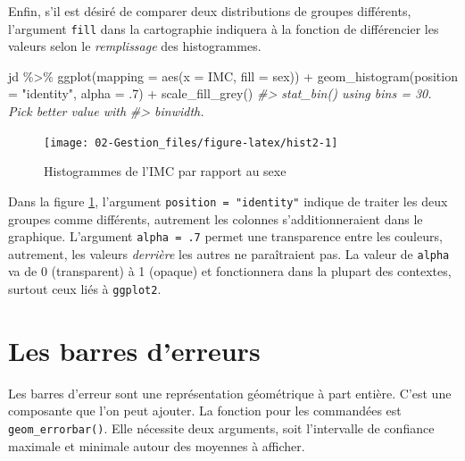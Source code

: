 \documentclass[
]{book}
\newenvironment{Shaded}{}{}
\newcommand{\AttributeTok}[1]{#1}
\newcommand{\CommentTok}[1]{\textit{#1}}
\newcommand{\DecValTok}[1]{#1}
\newcommand{\FunctionTok}[1]{#1}
\newcommand{\NormalTok}[1]{#1}
\newcommand{\SpecialCharTok}[1]{#1}
\newcommand{\StringTok}[1]{#1}
\begin{document}
Enfin, s'il est désiré de comparer deux distributions de groupes différents, l'argument \texttt{fill} dans la cartographie indiquera à la fonction de différencier les valeurs selon le \emph{remplissage} des histogrammes.

\begin{Shaded}
\begin{Highlighting}[]
\NormalTok{jd }\SpecialCharTok{\%\textgreater{}\%} 
  \FunctionTok{ggplot}\NormalTok{(}\AttributeTok{mapping =} \FunctionTok{aes}\NormalTok{(}\AttributeTok{x =}\NormalTok{ IMC, }\AttributeTok{fill =}\NormalTok{ sex)) }\SpecialCharTok{+} 
  \FunctionTok{geom\_histogram}\NormalTok{(}\AttributeTok{position =} \StringTok{"identity"}\NormalTok{, }\AttributeTok{alpha =}\NormalTok{ .}\DecValTok{7}\NormalTok{) }\SpecialCharTok{+} 
  \FunctionTok{scale\_fill\_grey}\NormalTok{()}
\CommentTok{\#\textgreater{} \textasciigrave{}stat\_bin()\textasciigrave{} using \textasciigrave{}bins = 30\textasciigrave{}. Pick better value with}
\CommentTok{\#\textgreater{} \textasciigrave{}binwidth\textasciigrave{}.}
\end{Highlighting}
\end{Shaded}

\begin{figure}

{\centering \texttt{[image: 02-Gestion\_files/figure-latex/hist2-1]} 

}

\caption{Histogrammes de l'IMC par rapport au sexe}\label{fig:hist2}
\end{figure}

Dans la figure \ref{fig:hist2}, l'argument \texttt{position\ =\ "identity"} indique de traiter les deux groupes comme différents, autrement les colonnes s'additionneraient dans le graphique. L'argument \texttt{alpha\ =\ .7} permet une transparence entre les couleurs, autrement, les valeurs \emph{derrière} les autres ne paraîtraient pas. La valeur de \texttt{alpha} va de 0 (transparent) à 1 (opaque) et fonctionnera dans la plupart des contextes, surtout ceux liés à \texttt{ggplot2}.

\hypertarget{les-barres-derreurs}{%
\section{Les barres d'erreurs}\label{les-barres-derreurs}}

Les barres d'erreur sont une représentation géométrique à part entière. C'est une composante que l'on peut ajouter. La fonction pour les commandées est \texttt{geom\_errorbar()}. Elle nécessite deux arguments, soit l'intervalle de confiance maximale et minimale autour des moyennes à afficher.
\end{document}

